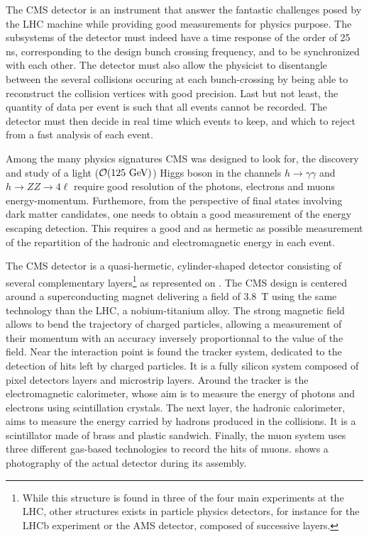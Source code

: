         The CMS detector \cite{CMSdetector} is an instrument that answer the fantastic challenges posed by
        the LHC machine while providing good measurements for physics purpose.
        The subsystems of the detector must indeed have a time response of the order of 25 ns,
        corresponding to the design bunch crossing frequency, and to be synchronized with
        each other. The detector must also allow the physicist to disentangle between the
        several collisions occuring at each bunch-crossing by being able to
        reconstruct the collision vertices with good precision. Last but not least,
        the quantity of data per event is such that all events cannot be recorded. The
        detector must then decide in real time which events to keep, and which to reject
        from a fast analysis of each event.

        Among the many physics signatures CMS was designed to look for, the discovery and study of a
        light ($\mathcal{O}(125 ~\text{GeV})$) Higgs boson in the channels $h\rightarrow\gamma\gamma$
        and $h\rightarrow ZZ \rightarrow 4\ell$ require good resolution of the photons,
        electrons and muons energy-momentum. Furthemore, from the perspective of final
        states involving dark matter candidates, one needs to obtain a good measurement
        of the energy escaping detection. This requires a good and as hermetic as
        possible measurement of the repartition of the hadronic and electromagnetic energy
        in each event.


        The CMS detector is a quasi-hermetic, cylinder-shaped detector consisting of
        several complementary layers\footnote{While this structure is found in three of the four
        main experiments at the LHC, other structures exists in particle physics detectors,
        for instance for the LHCb experiment or the AMS detector, composed of successive
        layers.}
        as represented on .
        The CMS design is centered around a superconducting magnet delivering a field of
        3.8~T using the same technology than the LHC, a nobium-titanium alloy. The strong
        magnetic field allows to bend the trajectory of charged particles, allowing a
        measurement of their momentum with an accuracy inversely proportionnal to the value
        of the field.
        Near the interaction point is found the tracker system, dedicated to
        the detection of hits left by charged particles. It is a fully silicon system composed of pixel detectors
        layers and microstrip layers. Around the tracker is the electromagnetic
        calorimeter, whose aim is to measure the energy of photons and electrons using
        scintillation crystals. The next layer, the hadronic calorimeter, aims to measure
        the energy carried by hadrons produced in the collisions. It is a scintillator made
        of brass and plastic sandwich. Finally, the muon system uses three different gas-based
        technologies to record the hits of muons. 
        shows a photography of the actual detector during its assembly.

